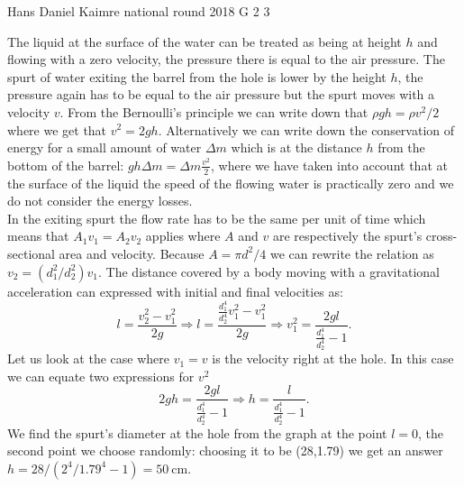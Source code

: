 \documentclass[11pt]{article}
\begin{document}
{Hans Daniel Kaimre} %
{national round} %
{2018} %
{G 2} %
{3} %
{

\ifEngSolution
The liquid at the surface of the water can be treated as being at height $h$ and flowing with a zero velocity, the pressure there is equal to the air pressure. The spurt of water exiting the barrel from the hole is lower by the height $h$, the pressure again has to be equal to the air pressure but the spurt moves with a velocity $v$. From the Bernoulli’s principle we can write down that $\rho g h = \rho v^2/2$ where we get that $v^2=2gh$. Alternatively we can write down the conservation of energy for a small amount of water $\Delta m$ which is at the distance $h$ from the bottom of the barrel: $ g h \Delta m = \Delta m \frac{v^2}{2}$, where we have taken into account that at the surface of the liquid the speed of the flowing water is practically zero and we do not consider the energy losses.\\
In the exiting spurt the flow rate has to be the same per unit of time which means that $A_1v_1=A_2v_2$ applies where $A$ and $v$ are respectively the spurt’s cross-sectional area and velocity. Because $A=\pi d^2/4$ we can rewrite the relation as $v_2=(d_1^2/d_2^2)v_1$. The distance covered by a body moving with a gravitational acceleration can expressed with initial and final velocities as:
$$l=\frac{v_2^2-v_1^2}{2g} \Rightarrow l=\frac{\frac{d_1^4}{d_2^4}v_1^2-v_1^2}{2g} \Rightarrow v_1^2=\frac{2gl}{\frac{d_1^4}{d_2^4}-1}.$$
Let us look at the case where $v_1=v$ is the velocity right at the hole. In this case we can equate two expressions for $v^2$ 
$$2gh=\frac{2gl}{\frac{d_1^4}{d_2^4}-1}\Rightarrow h=\frac{l}{\frac{d_1^4}{d_2^4}-1}.$$
We find the spurt’s diameter at the hole from the graph at the point $l=0$, the second point we choose randomly: choosing it to be (28,\num{1.79}) we get an answer $h=28/(2^4/\num{1.79}^4-1)=\SI{50}{\cm}$.
\fi
}
\end{document}
